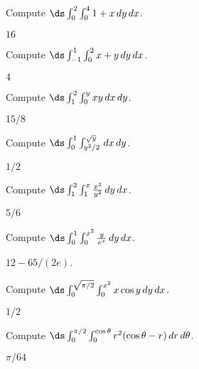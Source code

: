 \begin{enumialphparenastyle}

\begin{ex}
Compute $\ds \int_{0}^{2}\int_{0}^{4} 1+x \,dy\,dx$.
\begin{sol}
$16$
\end{sol}
\end{ex}

\begin{ex}
Compute $\ds \int_{-1}^{1}\int_{0}^{2} x+y\,dy\,dx$.
\begin{sol}
$4$
\end{sol}
\end{ex}

\begin{ex}
Compute $\ds \int_{1}^{2}\int_{0}^{y} xy \,dx\,dy$.
\begin{sol}
$15/8$
\end{sol}
\end{ex}

\begin{ex}
Compute $\ds \int_{0}^{1}\int_{y^2/2}^{\sqrt y} \,dx\,dy$.
\begin{sol}
$1/2$
\end{sol}
\end{ex}

\begin{ex}
Compute $\ds \int_{1}^{2}\int_{1}^{x} {x^2\over y^2}\,dy\,dx$.
\begin{sol}
$5/6$
\end{sol}
\end{ex}

\begin{ex}
Compute $\ds \int_{0}^{1}\int_{0}^{x^2} {y\over e^x}\,dy\,dx$.
\begin{sol}
$12-65/(2e)$.
\end{sol}
\end{ex}

\begin{ex}
Compute $\ds \int_{0}^{\sqrt{\pi/2}}\int_{0}^{x^2} x\cos y\,dy\,dx$.
\begin{sol}
$1/2$
\end{sol}
\end{ex}

\begin{ex}
Compute $\ds \int_{0}^{\pi/2}\int_{0}^{\cos\theta}r^2
(\cos\theta-r) \,dr\,d\theta$.
\begin{sol}
$\pi/64$
\end{sol}
\end{ex}


\end{enumialphparenastyle}
